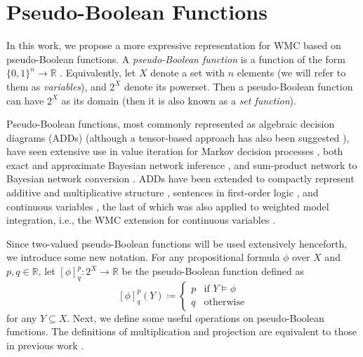 \section{Pseudo-Boolean Functions}

In this work, we propose a more expressive representation for WMC based on
pseudo-Boolean functions. A \emph{pseudo-Boolean function} is a function of the
form $\{ 0, 1 \}^n \to \mathbb{R}$ \cite{DBLP:journals/dam/BorosH02}.
Equivalently, let $X$ denote a set with $n$ elements (we will refer to them as
\emph{variables}), and $2^X$ denote its powerset. Then a pseudo-Boolean function
can have $2^X$ as its domain (then it is also known as a \emph{set function}).

Pseudo-Boolean functions, most commonly represented as
algebraic decision diagrams (ADDs) \cite{DBLP:journals/fmsd/BaharFGHMPS97}
(although a tensor-based approach has also been suggested
\cite{DBLP:journals/corr/abs-1908-04381,DBLP:conf/cp/DudekPV20}), have seen
extensive use in value iteration for Markov decision processes
\cite{DBLP:conf/uai/HoeySHB99}, both exact and approximate Bayesian network
inference \cite{DBLP:conf/ijcai/ChaviraD07,DBLP:conf/uai/GogateD11}, and
sum-product network \cite{DBLP:conf/uai/PoonD11} to Bayesian network conversion
\cite{DBLP:conf/icml/ZhaoMP15}. ADDs have been extended to compactly represent
additive and multiplicative structure \cite{DBLP:conf/ijcai/SannerM05},
sentences in first-order logic \cite{DBLP:journals/ai/SannerB09}, and continuous
variables \cite{DBLP:conf/uai/SannerDB11}, the last of which was also applied to
weighted model integration, i.e., the WMC extension for continuous variables
\cite{DBLP:conf/ijcai/BellePB15,DBLP:conf/ijcai/KolbMSBK18}.

Since two-valued pseudo-Boolean functions will be used extensively henceforth,
we introduce some new notation. For any propositional formula $\phi$ over $X$
and $p, q \in \mathbb{R}$, let $[\phi]^p_q\colon 2^X \to \mathbb{R}$ be the
pseudo-Boolean function defined as
\[
  [\phi]^p_q(Y) \coloneqq
  \begin{cases}
    p & \text{if } Y \models \phi \\
    q & \text{otherwise}
  \end{cases}
\]
for any $Y \subseteq X$. Next, we define some useful operations on
pseudo-Boolean functions. The definitions of multiplication and projection are
equivalent to those in previous work
\cite{DBLP:conf/aaai/DudekPV20,DBLP:conf/cp/DudekPV20}.

